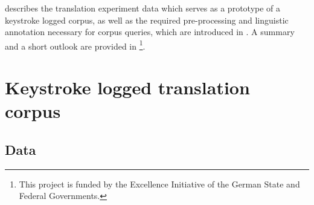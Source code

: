 \documentclass[output=paper]{LSP/langsci}
\begin{document}
 describes the translation experiment data which serves as a prototype of a keystroke logged corpus, as well as the required pre-processing and linguistic annotation necessary for corpus queries, which are introduced in . A summary and a short outlook are provided in \footnote{This project is funded by the Excellence Initiative of the German State and Federal Governments.}. 

\section{Keystroke logged translation corpus} \label{sec:1:2}
\subsection{Data} \label{sec:1:2:1}
\end{document}
